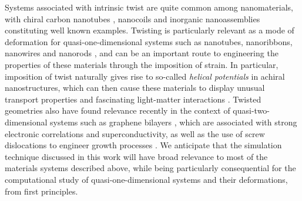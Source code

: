 \documentclass[preprint,12pt, 3p, sort&compress]{elsarticle}
\begin{document}
Systems associated with intrinsic twist are quite common among nanomaterials, with chiral carbon nanotubes \citep{endo2013carbon}, nanocoils \citep{chen2003mechanics} and inorganic nanoassemblies  \citep{ma2017chiral} constituting well known examples. Twisting is particularly relevant as a mode of deformation for quasi-one-dimensional systems such as nanotubes, nanoribbons, nanowires and nanorods  \citep{James_OS}, and can be an important route to engineering the properties of these materials through the imposition of strain. In particular, imposition of twist naturally gives rise to so-called \textit{helical potentials} in achiral nanostructures, which can then cause  these materials to display unusual transport properties and fascinating light-matter interactions \citep{aiello2020chirality}. Twisted geometries also have found relevance recently in the context of quasi-two-dimensional systems such as graphene bilayers \citep{bistritzer2011moire, cao2018unconventional, cao2018correlated, carr2019exact}, which are associated with strong electronic correlations and superconductivity, as well as the use of screw dislocations to engineer growth processes \citep{zhao2020supertwisted, bierman2008dislocation, jin2010new}. We anticipate that the simulation technique discussed in this work will have broad relevance to most of the materials systems described above, while being particularly consequential for the computational study of quasi-one-dimensional systems and their deformations, from first principles. 
\end{document}
